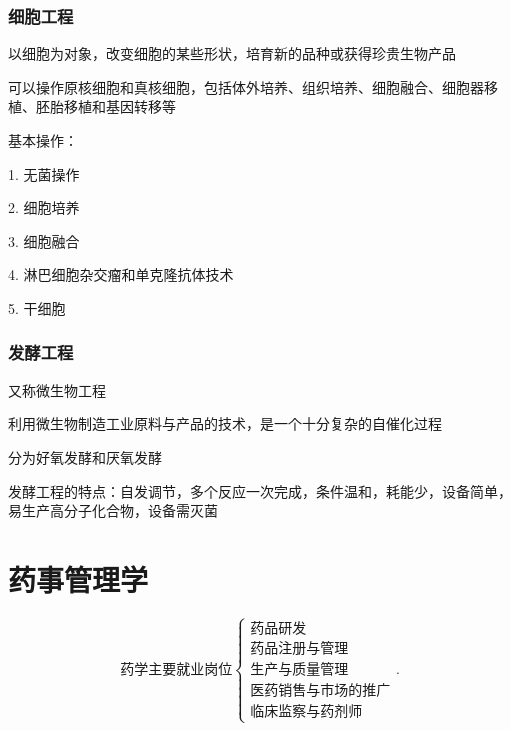 \subsubsection*{细胞工程}%
\label{subsub:细胞工程}
\begin{defi}
    以细胞为对象，改变细胞的某些形状，培育新的品种或获得珍贵生物产品
\end{defi}
可以操作原核细胞和真核细胞，包括体外培养、组织培养、细胞融合、细胞器移植、胚胎移植和基因转移等
\begin{notation}
    基本操作：

    1. 无菌操作

    2. 细胞培养

    3. 细胞融合

    4. 淋巴细胞杂交瘤和单克隆抗体技术

    5. 干细胞
\end{notation}
\subsubsection*{发酵工程}%
\label{subsub:发酵工程}
又称微生物工程

利用微生物制造工业原料与产品的技术，是一个十分复杂的自催化过程

分为好氧发酵和厌氧发酵
\begin{notation}
    发酵工程的特点：自发调节，多个反应一次完成，条件温和，耗能少，设备简单，易生产高分子化合物，设备需灭菌
\end{notation}
\section{药事管理学}%
\label{sec:药事管理学}
\[
    \text{药学主要就业岗位}
    \begin{cases}
        \text{药品研发}\\
        \text{药品注册与管理}\\
        \text{生产与质量管理}\\
        \text{医药销售与市场的推广}\\
        \text{临床监察与药剂师}
    \end{cases}
.\] 

